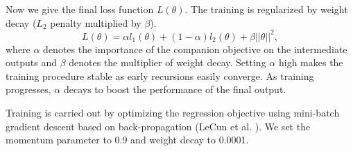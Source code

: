 \documentclass[10pt,twocolumn,letterpaper]{article}
\begin{document}
Now we give the final loss function $L(\theta)$. The training is regularized by weight decay ($L_2$ penalty multiplied by $\beta$). 
\begin{equation}
L(\theta)  =\alpha  l_1(\theta) + (1 - \alpha) l_2(\theta) + \beta ||\theta||^2,
\end{equation}
where $\alpha$ denotes the importance of the companion objective on the intermediate outputs and $\beta$ denotes the multiplier of weight decay.   Setting $\alpha$ high makes the training procedure stable as early recursions easily converge. As training progresses, $\alpha$ decays to boost the performance of the final output. 

Training is carried out by optimizing the regression objective using mini-batch gradient descent based on back-propagation (LeCun et al. \cite{lecun1998gradient}). We set the momentum parameter to 0.9 and weight decay to 0.0001.
%
%
%
%
%
%
%
\end{document}
